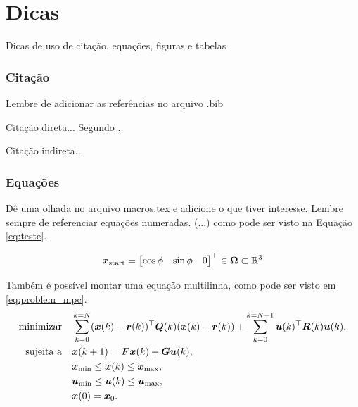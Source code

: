 \chapter{Dicas}

Dicas de uso de citação, equações, figuras e tabelas

\subsection{Citação}
Lembre de adicionar as referências no arquivo .bib

Citação direta... Segundo \cite{accardi2012}.

Citação indireta... \citep{accardi2012}

\subsection{Equações}

Dê uma olhada no arquivo macros.tex e adicione o que tiver interesse. Lembre sempre de referenciar equações numeradas. (...) como pode ser visto na Equação \ref{eq:teste}.

\begin{equation}
    \boldsymbol{x}_{\text{start}} = \begin{bmatrix}
        \cos{\phi} & \sin{\phi} & 0
    \end{bmatrix}^\top \in \boldsymbol{\Omega} \subset \mathbb{R}^3
    \label{eq:teste}
\end{equation}

Também é possível montar uma equação multilinha, como pode ser visto em \ref{eq:problem_mpc}.
\begin{equation}
    \begin{split}
        \text{minimizar} & \quad \sum_{k = 0}^{k = N} (\boldsymbol{x}(k) - \boldsymbol{r}(k))^\top \boldsymbol{Q}(k) (\boldsymbol{x}(k) - \boldsymbol{r}(k)) + \sum_{k = 0}^{k = N - 1} \boldsymbol{u}(k)^\top \boldsymbol{R}(k) \boldsymbol{u}(k), \\
        \text{sujeita a} & \quad \boldsymbol{x}(k+1) = \boldsymbol{F} \boldsymbol{x}(k) + \boldsymbol{G} \boldsymbol{u}(k), \\
        & \quad \boldsymbol{x}_{\min} \leq \boldsymbol{x}(k)\leq \boldsymbol{x}_{\max}, \\
        & \quad \boldsymbol{u}_{\min} \leq \boldsymbol{u}(k)\leq \boldsymbol{u}_{\max}, \\
        & \quad \boldsymbol{x}(0) = \boldsymbol{x}_0.
    \end{split}
    \label{eq:problem_mpc}
\end{equation}

